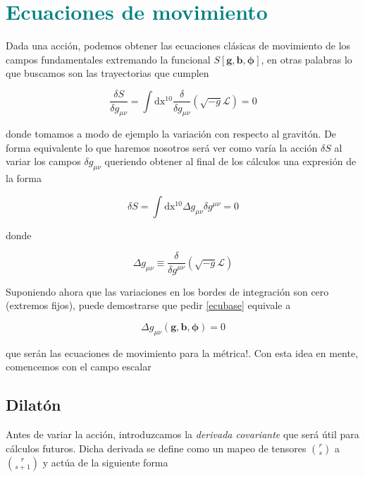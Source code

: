 \documentclass{article}
\numberwithin{equation}{section}
\begin{document}
\newpage

\section{\textcolor{teal}{Ecuaciones de movimiento}}\label{ecu}

Dada una acción, podemos obtener las ecuaciones clásicas de movimiento de los campos fundamentales extremando la funcional $S[\textbf{g},\textbf{b},\pmb{\phi}] $, en otras palabras lo que buscamos son las trayectorias que cumplen

\begin{equation*}
\frac{\delta S}{\delta g_{\mu\nu}} = \int\mathrm{dx^{10}} \frac{\delta}{\delta g_{\mu\nu}} \left(\sqrt{-g} \mathscr{L}\right)=0
\end{equation*}

donde tomamos a modo de ejemplo la variación con respecto al gravitón. De forma equivalente lo que haremos nosotros será ver como varía la acción $\delta S $ al variar los campos $ \delta g_{\mu \nu} $ queriendo obtener al final de los cálculos una expresión de la forma

\begin{equation}\label{ecubase}
\delta S = \int \mathrm{dx^{10}} \Delta g_{\mu\nu} \delta g^{\mu\nu} = 0
\end{equation} 

donde 

\begin{equation*}
\Delta g_{\mu\nu} \equiv \frac{\delta}{\delta g^{\mu\nu}} \left(\sqrt{-g} \mathscr{L}\right)
\end{equation*}

Suponiendo ahora que las variaciones en los bordes de integración son cero (extremos fijos), puede demostrarse que pedir \ref{ecubase} equivale a 

\begin{equation*}
\Delta g_{\mu\nu}(\textbf{g},\textbf{b},\pmb{\phi}) =0
\end{equation*}

que serán las ecuaciones de movimiento para la métrica!. Con esta idea en mente, comencemos con el campo escalar

\subsection{Dilatón}

Antes de variar la acción, introduzcamos la \textit{derivada covariante} que será útil para cálculos futuros. Dicha derivada se define como un mapeo de tensores $\binom{r}{s}$ a $ \binom{r}{s+1} $  y actúa de la siguiente forma
\end{document}
